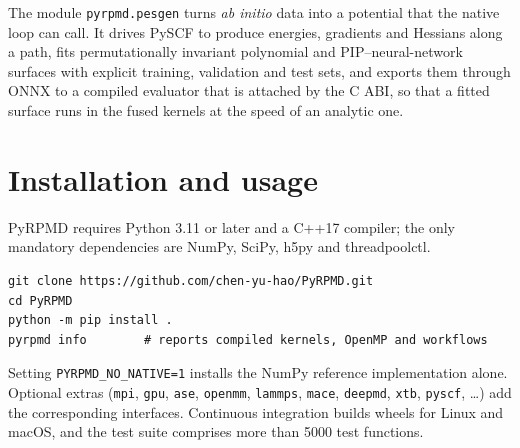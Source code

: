 \documentclass[preprint,12pt]{elsarticle}
\newcommand{\code}[1]{\texttt{#1}}
\begin{document}
The module \code{pyrpmd.pesgen} turns \emph{ab initio} data into a potential that the native loop can call. It drives PySCF to produce energies, gradients and Hessians along a path, fits permutationally invariant polynomial and PIP--neural-network surfaces \cite{pipnn2013} with explicit training, validation and test sets, and exports them through ONNX to a compiled evaluator that is attached by the C ABI, so that a fitted surface runs in the fused kernels at the speed of an analytic one.

\section{Installation and usage}
\label{sec:usage}

PyRPMD requires Python 3.11 or later and a C++17 compiler; the only mandatory dependencies are NumPy, SciPy, h5py and threadpoolctl.
\begin{lstlisting}
git clone https://github.com/chen-yu-hao/PyRPMD.git
cd PyRPMD
python -m pip install .
pyrpmd info        # reports compiled kernels, OpenMP and workflows
\end{lstlisting}
Setting \code{PYRPMD\_NO\_NATIVE=1} installs the NumPy reference implementation alone. Optional extras (\code{mpi}, \code{gpu}, \code{ase}, \code{openmm}, \code{lammps}, \code{mace}, \code{deepmd}, \code{xtb}, \code{pyscf}, \ldots) add the corresponding interfaces. Continuous integration builds wheels for Linux and macOS, and the test suite comprises more than 5000 test functions.
\end{document}
